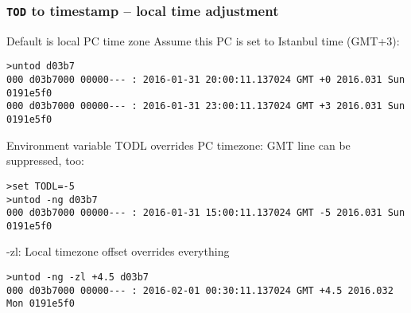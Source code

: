 \documentclass[10pt,xcolor=x11names]{beamer}
\newcommand{\tod}{\texttt{TOD}}
\begin{document}
\begin{frame}[fragile]
  \frametitle{\tod{} to timestamp -- local time adjustment}
  \begin{block}{Default is local PC time zone}
Assume this PC is set to Istanbul time (GMT+3):
  \begin{lstlisting}
>untod d03b7
000 d03b7000 00000--- : 2016-01-31 20:00:11.137024 GMT +0 2016.031 Sun 0191e5f0
000 d03b7000 00000--- : 2016-01-31 23:00:11.137024 GMT +3 2016.031 Sun 0191e5f0
  \end{lstlisting}
  \end{block}
  \begin{block}{Environment variable TODL overrides PC timezone:}
GMT line can be suppressed, too:
  \begin{lstlisting}
>set TODL=-5
>untod -ng d03b7
000 d03b7000 00000--- : 2016-01-31 15:00:11.137024 GMT -5 2016.031 Sun 0191e5f0
  \end{lstlisting}
  \end{block}

  \begin{block}{-zl: Local timezone offset overrides everything}

  \begin{lstlisting}
>untod -ng -zl +4.5 d03b7
000 d03b7000 00000--- : 2016-02-01 00:30:11.137024 GMT +4.5 2016.032 Mon 0191e5f0
  \end{lstlisting}
  \end{block}

\end{frame}
\end{document}
